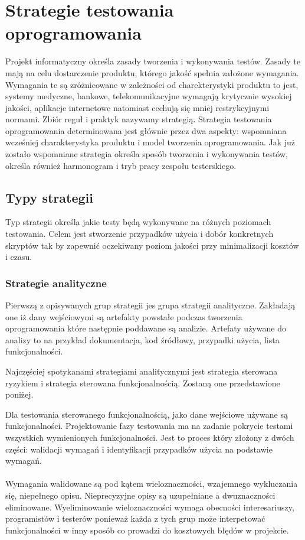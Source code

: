 \section{Strategie testowania oprogramowania}
\label{cha:strategie testowania}
Projekt informatyczny określa zasady tworzenia i wykonywania testów. Zasady te mają na celu dostarczenie produktu, którego jakość spełnia założone wymagania. Wymagania te są zróżnicowane w zależności od charekterystyki produktu to jest, systemy medyczne, bankowe, telekomunikacyjne wymagają krytycznie wysokiej jakości, aplikacje internetowe natomiast cechują się mniej restrykcyjnymi normami. Zbiór reguł i praktyk nazywamy strategią. Strategia testowania oprogramowania determinowana jest głównie przez dwa aspekty: wspomniana wcześniej charakterystyka produktu i model tworzenia oprogramowania. 
Jak już zostało wspomniane strategia określa sposób tworzenia i wykonywania testów, określa również harmonogram i tryb pracy zespołu testerskiego.


\subsection{Typy strategii}
Typ strategii określa jakie testy będą wykonywane na różnych poziomach testowania. Celem jest stworzenie przypadków użycia i dobór konkretnych skryptów tak by zapewnić oczekiwany poziom jakości przy minimalizacji kosztów i czasu.
\subsubsection{Strategie analityczne}
Pierwszą z opisywanych grup strategii jes grupa strategii analityczne. Zakładają one iż dany wejściowymi są artefakty powstałe podczas tworzenia oprogramowania które następnie poddawane są analizie. Artefaty używane do analizy to na przykład dokumentacja, kod źródłowy, przypadki użycia, lista funkcjonalności.

Najczęściej spotykanami strategiami analitycznymi jest strategia sterowana ryzykiem i strategia sterowana funkcjonalnością. Zostaną one przedstawione poniżej.

Dla testowania sterowanego funkcjonalnością, jako dane wejściowe używane są funkcjonalności. Projektowanie fazy testowania ma na zadanie pokrycie testami wszystkich wymienionych funkcjonalności. Jest to proces który złożony z dwóch części: walidacji wymagań i identyfikacji przypadków użycia na podstawie wymagań. 
\paragraph{}
Wymagania walidowane są pod kątem wieloznaczności, wzajemnego wykluczania się, niepełnego opisu. Nieprecyzyjne opisy są uzupełniane a dwuznaczności eliminowane. Wyeliminowanie wieloznaczności wymaga obecności interesariuszy, programistów i testerów ponieważ każda z tych grup może interpetować funkcjonalności w inny sposób co prowadzi do kosztowych błędów w projekcie.
